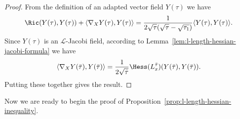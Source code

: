 \begin{proof}
From the definition of an adapted vector field  $Y(\tau)$  we have
\begin{equation*}
\Ric(Y(\tau),Y(\tau)) + \langle
\nabla_{X}Y(\tau),Y(\tau)\rangle =
\frac{1}{2\sqrt{\tau}(\sqrt{\tau}-\sqrt{\tau_1})}\langle
Y(\tau),Y(\tau)\rangle.
\end{equation*}
Since $Y(\tau)$ is an ${\mathcal L}$-Jacobi field, according to
Lemma~\ref{lem:l-length-hessian-jacobi-formula} we have
$$\langle\nabla_XY(\bar\tau),Y(\bar\tau)\rangle =
\frac{1}{2\sqrt{\bar\tau}}\Hess(L_x^{\bar\tau})(Y(\bar\tau),Y(\bar\tau)).$$ Putting these
together gives the result.
\end{proof}

Now we are ready to begin the proof of Proposition~\ref{prop:l-length-hessian-inequality}.


